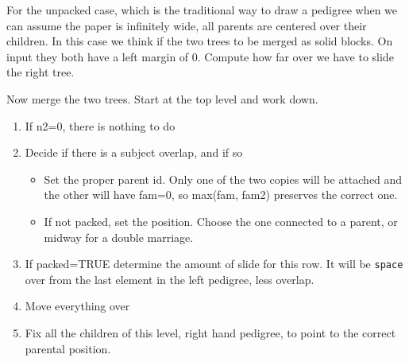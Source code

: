 \documentclass{article}
\begin{document}
For the unpacked case, which is the traditional way to draw a pedigree
when we can assume the paper is infinitely wide, all parents are centered
over their children.  
In this case we think if the two trees to be merged as solid blocks.
On input they both have a left margin of 0.
Compute how far over we have to slide the right tree.

Now merge the two trees. 
Start at the top level and work down.
\begin{enumerate}
  \item If n2=0, there is nothing to do
  \item Decide if there is a subject overlap, and if so 
    \begin{itemize}
      \item Set the proper parent id. 
        Only one of the two copies will be attached and the other
        will have fam=0, so max(fam, fam2) preserves the correct one.
      \item If not packed, set the position.  Choose the one connected
        to a parent, or midway for a double marriage.
    \end{itemize}
  \item If packed=TRUE determine the amount of slide for this row. It
    will be \Verb!space! over from the last element in the left pedigree,
    less overlap.
  \item Move everything over
  \item Fix all the children of this level, right hand pedigree, to
    point to the correct parental position.
\end{enumerate}
\end{document}
